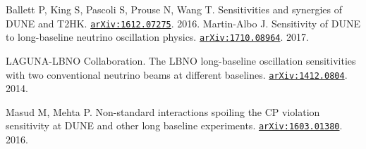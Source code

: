 \begin{thebibliography}{100}
	 Ballett P, King S, Pascoli S, Prouse N, Wang T.
		Sensitivities and synergies of DUNE and T2HK. \href{
		https://arxiv.org/pdf/1612.07275.pdf}{\texttt{arXiv:1612.07275}}. 2016.
	 Martin-Albo J. Sensitivity of DUNE to long-baseline
		neutrino oscillation physics.
		\href{https://arxiv.org/abs/1710.08964}{\texttt{arXiv:1710.08964}}. 2017.

	 LAGUNA-LBNO Collaboration. The LBNO long-baseline
		oscillation sensitivities with two conventional neutrino beams at different
		baselines.
		\href{https://arxiv.org/abs/1412.0804}{\texttt{arXiv:1412.0804}}. 2014.

	 Masud M, Mehta P. Non-standard interactions spoiling the CP
		violation sensitivity at DUNE and other long baseline experiments.
		\href{https://arxiv.org/abs/1603.01380}{\texttt{arXiv:1603.01380}}. 2016.




\end{thebibliography}

